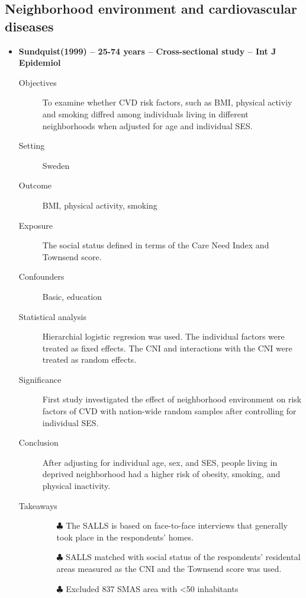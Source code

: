 \documentclass{article}
\begin{document}
\subsection{Neighborhood environment and cardiovascular diseases}
\begin{itemize}
	\item{\bf Sundquist(1999) -- 25-74 years -- Cross-sectional study -- Int J Epidemiol} 
		\begin{description}
			\item[Objectives]
				To examine whether CVD risk factors, such as BMI, physical activiy and smoking diffred among individuals living in different neighborhoods when adjusted for age and individual SES.
			\item[Setting] 
				Sweden 
			\item[Outcome]
				BMI, physical activity, smoking
			\item[Exposure] 
				The social status defined in terms of the Care Need Index and Townsend score.
			\item[Confounders] 
				Basic, education
			\item[Statistical analysis] 
				Hierarchial logistic regresion was used. The individual factors were treated as fixed effects. The CNI and interactions with the CNI were treated as random effects.
			\item[Significance] 
				First study investigated the effect of neighborhood environment on risk factors of CVD with nation-wide random samples after controlling for individual SES. 
			\item[Conclusion] 
				After adjusting for individual age, sex, and SES, people living in deprived neighborhood had a higher risk of obesity, smoking, and physical inactivity.
			\item[Takeaways] \mbox{}\par
				\begin{itemize}
					\item[$\clubsuit$] The SALLS is based on face-to-face interviews that generally took place in the respondents' homes.
					\item[$\clubsuit$] SALLS matched with social status of the respondents' residental areas measured as the CNI and the Townsend score was used.
					\item[$\clubsuit$] Excluded 837 SMAS area with <50 inhabitants
				\end{itemize}
		\end{description}



\end{itemize}
\end{document}
